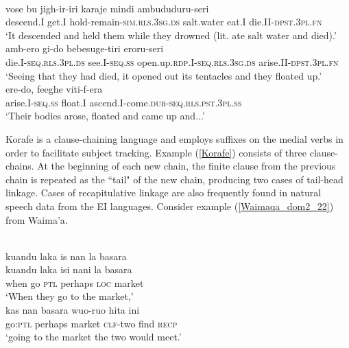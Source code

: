\ea \label{Korafe}
\\
\ea
\gll vose bu jigh-ir-iri karaje mindi ambududuru-seri \\
descend.I get.I hold-remain-\textsc{sim}.\textsc{rls}.3\textsc{sg}.\textsc{ds} salt.water eat.I die.II-\textsc{dpst}.3\textsc{pl}.\textsc{fn} \\
\glft `It descended and held them while they drowned (lit. ate salt water and died).' \\ 
\ex
\gll amb-ero gi-do bebesuge-tiri eroru-seri \\
die.I-\textsc{seq}.\textsc{rls}.3\textsc{pl}.\textsc{ds} see.I-\textsc{seq}.\textsc{ss} open.up.\textsc{rdp}.I-\textsc{seq}.\textsc{rls}.3\textsc{sg}.\textsc{ds} arise.II-\textsc{dpst}.3\textsc{pl}.\textsc{fn} \\
\glft `Seeing that they had died, it opened out its tentacles and they floated up.' \\ 
\ex
\gll ere-do, feeghe viti-f-era \\ 
arise.I-\textsc{seq}.\textsc{ss} float.I ascend.I-come.\textsc{dur}-\textsc{seq}.\textsc{rls}.\textsc{pst}.3\textsc{pl}.\textsc{ss} \\
\glft `Their bodies arose, floated and came up and...' \\ 
\z
\z

Korafe is a clause-chaining language and employs suffixes on the medial verbs in order to facilitate subject tracking. Example (\ref{Korafe}) consists of three clause-chains. At the beginning of each new chain, the finite clause from the previous chain is repeated as the ``tail" of the new chain, producing two cases of tail-head linkage. Cases of recapitulative linkage are also frequently found in natural speech data from the EI languages. Consider example (\ref{Waimaqa_dom2_22}) from Waima'a.

\ea \label{Waimaqa_dom2_22}
\\
\ea
\glll kuandu laka is nan la basara \\
kuandu laka isi nani la basara \\
when go \textsc{ptl} perhaps \textsc{loc} market \\
\glft `When they go to the market,' \\ 
\ex
\gll kas nan basara wuo-ruo hita ini \\ 
go:\textsc{ptl} perhaps market \textsc{clf}-two find \textsc{recp} \\
\glft `going to the market the two would meet.'\\ 
\z
\z

